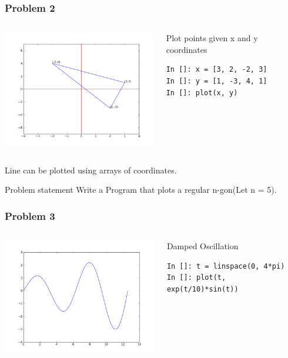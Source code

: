 \documentclass[14pt,compress]{beamer}
\begin{document}
\begin{frame}[fragile]
  \frametitle{Problem 2}
  \begin{columns}
    \hspace*{-0.5in}
    \includegraphics[height=2in, interpolate=true]{data/triangle}
    \begin{block}{Plot points given x and y coordinates}
    \tiny
    \begin{lstlisting}
In []: x = [3, 2, -2, 3]
In []: y = [1, -3, 4, 1]
In []: plot(x, y)
    \end{lstlisting}
    \end{block}
  \end{columns}
  Line can be plotted using arrays of coordinates.
  \pause
  \begin{block}{Problem statement}
    Write a Program that plots a regular n-gon(Let n = 5).
  \end{block}  
\end{frame}


\begin{frame}[fragile]
  \frametitle{Problem 3}
  \begin{columns}
    \hspace*{-0.5in}
    \includegraphics[height=2in, interpolate=true]{data/damp}
    \begin{block}{Damped Oscillation}
    \tiny
    \begin{lstlisting}
In []: t = linspace(0, 4*pi)
In []: plot(t, exp(t/10)*sin(t))
    \end{lstlisting}
    \end{block}
  \end{columns}
\end{frame}
\end{document}
